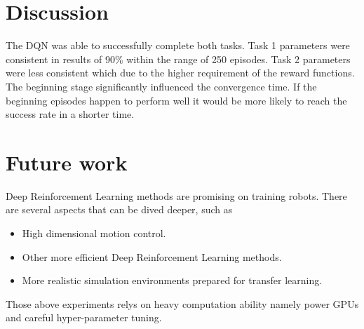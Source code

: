 \documentclass[10pt,journal,compsoc]{IEEEtran}
\begin{document}
\section{Discussion}

The DQN was able to successfully complete both tasks. Task 1 parameters were consistent in results of 90\% within the range of 250 episodes. Task 2 parameters were less consistent which due to the higher requirement of the reward functions. The beginning stage significantly influenced the convergence time. If the beginning episodes happen to perform well it would be more likely to reach the success rate in a shorter time.

\section{Future work}

Deep Reinforcement Learning methods are promising on training robots. There are several aspects that can be dived deeper, such as

\begin{itemize}
    \item High dimensional motion control.
    \item Other more efficient Deep Reinforcement Learning methods.
    \item More realistic simulation environments prepared for transfer learning.
\end{itemize}

Those above experiments relys on heavy computation ability namely power GPUs and careful hyper-parameter tuning.
\end{document}
